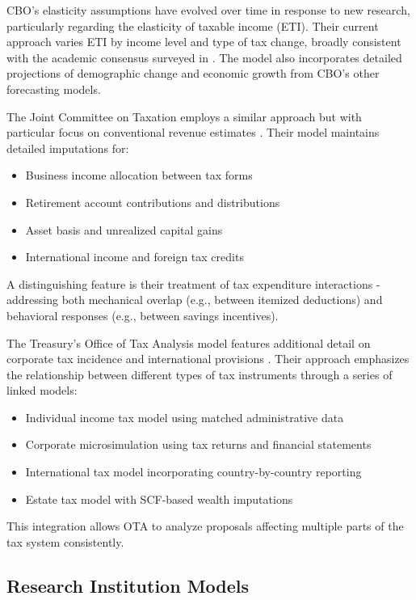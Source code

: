 CBO's elasticity assumptions have evolved over time in response to new research, particularly regarding the elasticity of taxable income (ETI). Their current approach varies ETI by income level and type of tax change, broadly consistent with the academic consensus surveyed in \cite{saez2012}. The model also incorporates detailed projections of demographic change and economic growth from CBO's other forecasting models.

The Joint Committee on Taxation employs a similar approach but with particular focus on conventional revenue estimates \cite{jct2023}. Their model maintains detailed imputations for:

\begin{itemize}
    \item Business income allocation between tax forms
    \item Retirement account contributions and distributions
    \item Asset basis and unrealized capital gains
    \item International income and foreign tax credits
\end{itemize}

A distinguishing feature is their treatment of tax expenditure interactions - addressing both mechanical overlap (e.g., between itemized deductions) and behavioral responses (e.g., between savings incentives).

The Treasury's Office of Tax Analysis model features additional detail on corporate tax incidence and international provisions \cite{ota2012}. Their approach emphasizes the relationship between different types of tax instruments through a series of linked models:

\begin{itemize}
    \item Individual income tax model using matched administrative data
    \item Corporate microsimulation using tax returns and financial statements
    \item International tax model incorporating country-by-country reporting
    \item Estate tax model with SCF-based wealth imputations
\end{itemize}

This integration allows OTA to analyze proposals affecting multiple parts of the tax system consistently.

\subsection{Research Institution Models}

